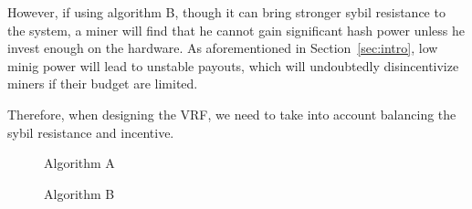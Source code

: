 However, if using algorithm B, though it can bring stronger sybil resistance to the system, a miner will find that he cannot gain significant hash power unless he invest enough on the hardware.
As aforementioned in Section~\ref{sec:intro}, low minig power will lead to unstable payouts, which will undoubtedly disincentivize miners if their budget are limited.

Therefore, when designing the VRF, we need to take into account balancing the sybil resistance and incentive.

\begin{figure}
\centering
{}
\caption{Algorithm A}
\label{fig:algo_A}
\end{figure}


\begin{figure}
\centering
{}
\caption{Algorithm B}
\label{fig:algo_B}
\end{figure}
